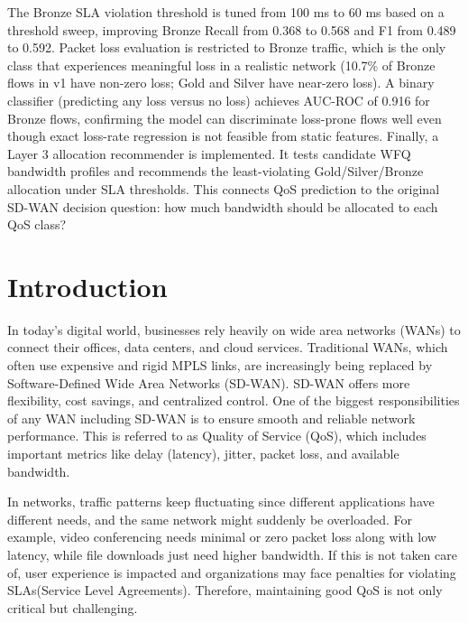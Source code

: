 \documentclass[a4paper,12pt]{Classes/RoboticsLaTeX}
\begin{document}
\begin{abstracts}
The Bronze SLA violation threshold is tuned from 100 ms to 60 ms based on a threshold sweep, improving Bronze Recall from 0.368 to 0.568 and F1 from 0.489 to 0.592. Packet loss evaluation is restricted to Bronze traffic, which is the only class that experiences meaningful loss in a realistic network (10.7\% of Bronze flows in v1 have non-zero loss; Gold and Silver have near-zero loss). A binary classifier (predicting any loss versus no loss) achieves AUC-ROC of 0.916 for Bronze flows, confirming the model can discriminate loss-prone flows well even though exact loss-rate regression is not feasible from static features. Finally, a Layer 3 allocation recommender is implemented. It tests candidate WFQ bandwidth profiles and recommends the least-violating Gold/Silver/Bronze allocation under SLA thresholds. This connects QoS prediction to the original SD-WAN decision question: how much bandwidth should be allocated to each QoS class?
	\end{abstracts}
	
	\tableofcontents
	\listoffigures
	\listoftables
		
	
	\mainmatter
	
	
	\chapter{Introduction}
	\label{chap:introduction}

    In today’s digital world, businesses rely heavily on wide area networks (WANs) to connect their offices, data centers, and cloud services. Traditional WANs, which often use expensive and rigid MPLS links, are increasingly being replaced by Software-Defined Wide Area Networks (SD-WAN). SD-WAN offers more flexibility, cost savings, and centralized control. One of the biggest responsibilities of any WAN including SD-WAN is to ensure smooth and reliable network performance. This is referred to as Quality of Service (QoS), which includes important metrics like delay (latency), jitter, packet loss, and available bandwidth.

    In networks, traffic patterns keep fluctuating since different applications have different needs, and the same network might suddenly be overloaded. For example, video conferencing needs minimal or zero packet loss along with low latency, while file downloads just need higher bandwidth. If this is not taken care of, user experience is impacted and organizations may face penalties for violating SLAs(Service Level Agreements). Therefore, maintaining good QoS is not only critical but challenging.
\end{document}
